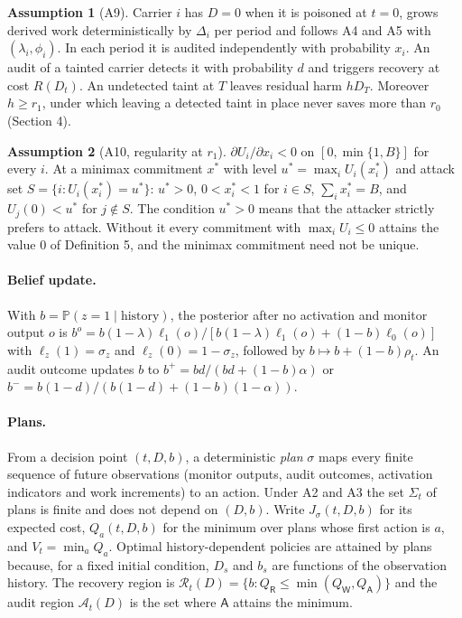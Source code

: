 \documentclass[11pt]{article}
\theoremstyle{definition}
\newtheorem{assumption}{Assumption}
\newcommand{\Rc}{\mathcal{R}}
\newcommand{\Ac}{\mathcal{A}}
\renewcommand{\P}{\mathbb{P}}
\newcommand{\Wa}{\mathsf{W}}
\newcommand{\Aa}{\mathsf{A}}
\newcommand{\Ra}{\mathsf{R}}
\begin{document}
\begin{assumption}[A9]
Carrier $i$ has $D=0$ when it is poisoned at $t=0$, grows derived work deterministically by $\Delta_i$
per period and follows A4 and A5 with $(\lambda_i,\phi_i)$. In each period it is audited independently with probability $x_i$. An audit of a
tainted carrier detects it with probability $d$ and triggers recovery at cost $R(D_t)$. An undetected
taint at $T$ leaves residual harm $hD_T$. Moreover $h\ge r_1$, under which leaving a detected taint in
place never saves more than $r_0$ (Section 4).
\end{assumption}
\begin{assumption}[A10, regularity at $r_1$]
$\partial U_i/\partial x_i<0$ on $[0,\min\{1,B\}]$ for every $i$. At a minimax commitment $x^*$ with
level $u^*=\max_iU_i(x^*_i)$ and attack set $S=\{i:U_i(x_i^*)=u^*\}$: $u^*>0$, $0<x^*_i<1$ for $i\in S$,
$\sum_ix_i^*=B$, and $U_j(0)<u^*$ for $j\notin S$. The condition $u^*>0$ means that the attacker strictly
prefers to attack. Without it every commitment with $\max_iU_i\le0$ attains the value $0$ of
Definition 5, and the minimax commitment need not be unique.
\end{assumption}

\paragraph{Belief update.} With $b=\P(z=1\mid\text{history})$, the posterior after no activation and
monitor output $o$ is $b^o=b(1-\lambda)\ell_1(o)/[b(1-\lambda)\ell_1(o)+(1-b)\ell_0(o)]$ with
$\ell_z(1)=\sigma_z$ and $\ell_z(0)=1-\sigma_z$, followed by $b\mapsto b+(1-b)\rho_t$. An audit outcome
updates $b$ to $b^+=bd/(bd+(1-b)\alpha)$ or $b^-=b(1-d)/(b(1-d)+(1-b)(1-\alpha))$.

\paragraph{Plans.} From a decision point $(t,D,b)$, a deterministic \emph{plan} $\sigma$ maps every finite
sequence of future observations (monitor outputs, audit outcomes, activation indicators and work
increments) to an action. Under A2 and A3 the set $\Sigma_t$ of plans is finite and does not depend on
$(D,b)$. Write $J_\sigma(t,D,b)$ for its expected cost, $Q_a(t,D,b)$ for the minimum over plans whose first
action is $a$, and $V_t=\min_aQ_a$. Optimal history-dependent policies are attained by plans because, for a
fixed initial condition, $D_s$ and $b_s$ are functions of the observation history. The recovery region is
$\Rc_t(D)=\{b:Q_\Ra\le\min(Q_\Wa,Q_\Aa)\}$ and the audit region $\Ac_t(D)$ is the set where $\Aa$ attains
the minimum.
\end{document}
